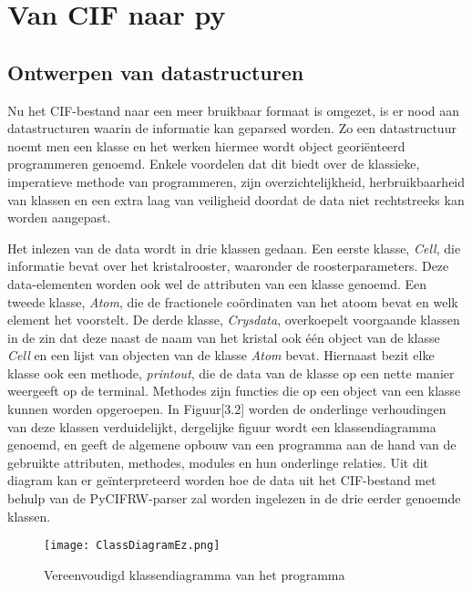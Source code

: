 \section{Van CIF naar py}

\subsection{Ontwerpen van datastructuren}
Nu het CIF-bestand naar een meer bruikbaar formaat is omgezet, is er nood aan datastructuren waarin de informatie kan geparsed worden. Zo een datastructuur noemt men een klasse en het werken hiermee wordt object georiënteerd programmeren genoemd. Enkele voordelen dat dit biedt over de klassieke, imperatieve methode van programmeren, zijn overzichtelijkheid, herbruikbaarheid van klassen en een extra laag van veiligheid doordat de data niet rechtstreeks kan worden aangepast.
\par
Het inlezen van de data wordt in drie klassen gedaan. Een eerste klasse, \textit{Cell}, die informatie bevat over het kristalrooster, waaronder de roosterparameters. Deze data-elementen worden ook wel de attributen van een klasse genoemd. Een tweede klasse, \textit{Atom}, die de fractionele coördinaten van het atoom bevat en welk element het voorstelt. De derde klasse, \textit{Crysdata}, overkoepelt voorgaande klassen in de zin dat deze naast de naam van het kristal ook één object van de klasse \textit{Cell} en een lijst van objecten van de klasse \textit{Atom} bevat. Hiernaast bezit elke klasse ook een methode, \textit{printout}, die de data van de klasse op een nette manier weergeeft op de terminal. Methodes zijn functies die op een object van een klasse kunnen worden opgeroepen.  In Figuur[3.2] worden de onderlinge verhoudingen van deze klassen verduidelijkt, dergelijke figuur wordt een klassendiagramma genoemd, en geeft de algemene opbouw van een programma aan de hand van de gebruikte attributen, methodes, modules en hun onderlinge relaties. Uit dit diagram kan er geïnterpreteerd worden hoe de data uit het CIF-bestand met behulp van de PyCIFRW-parser zal worden ingelezen in de drie eerder genoemde klassen.

\begin{figure}[h]
\texttt{[image: ClassDiagramEz.png]}
\caption{Vereenvoudigd klassendiagramma van het programma}
\end{figure}

